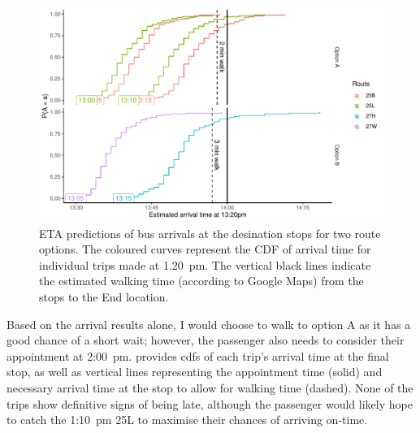 \begin{knitrout}\small
{}\color{fgcolor}\begin{figure}

{\centering \includegraphics[width=\textwidth]{figure/eta_journey_arriveby-1} 

}

\caption[ETA predictions of bus arrivals at the desination stops for two route options]{ETA predictions of bus arrivals at the desination stops for two route options. The coloured curves represent the CDF of arrival time for individual trips made at 1.20~pm. The vertical black lines indicate the estimated walking time (according to Google Maps) from the stops to the End location.}\label{fig:eta_journey_arriveby}
\end{figure}


\end{knitrout}

Based on the arrival results alone, I would choose to walk to option A as it has a good chance of a short wait; however, the passenger also needs to consider their appointment at  2:00~pm.  provides \glspl{cdf} of each trip's arrival time at the final stop, as well as vertical lines representing the appointment time (solid) and necessary arrival time at the stop to allow for walking time (dashed). None of the trips show definitive signs of being late, although the passenger would likely hope to catch the 1:10~pm 25L to maximise their chances of arriving on-time.


